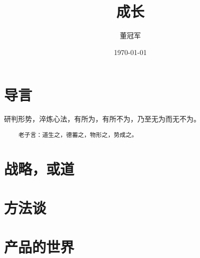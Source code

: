 \documentclass[UTF8]{ctexart}
\title{成长}
\author{董冠军}
\date{\today}
\begin{document}
\maketitle
\tableofcontents

\section{导言}

研判形势，淬炼心法，有所为，有所不为，乃至无为而无不为。

\begin{verbatim}
    老子言：道生之，德蓄之，物形之，势成之。
\end{verbatim}

\section{战略，或道}

\section{方法谈}

\section{产品的世界}
\end{document}
